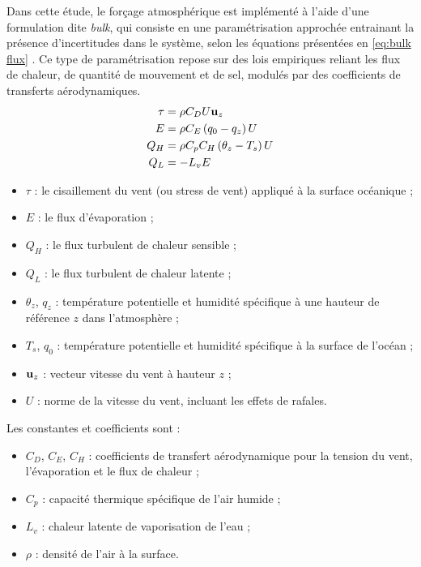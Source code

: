 Dans cette étude, le forçage atmosphérique est implémenté à l’aide d’une formulation dite \textit{bulk}, qui consiste en une paramétrisation approchée entrainant la présence d'incertitudes dans le système, selon les équations présentées en \autoref{eq:bulk flux} \cite{bonino_bulk_2022}. Ce type de paramétrisation repose sur des lois empiriques reliant les flux de chaleur, de quantité de mouvement et de sel, modulés par des coefficients de transferts aérodynamiques.
\begin{subequations}
\label{eq:bulk flux}
\begin{align}
	\tau & = \rho C_D U \mathbf{u}_z \label{eq:bulk cd} \\
	E & = \rho C_E \left( q_0 - q_z \right) U \\
	Q_H & = \rho C_p C_H \left( \theta_z - T_s \right) U \\
	Q_L & = - L_v E
\end{align}
\end{subequations}

\begin{itemize}
	\item $\tau$ : le cisaillement du vent (ou stress de vent) appliqué à la surface océanique ;
	\item $E$ : le flux d'évaporation ;
	\item $Q_H$ : le flux turbulent de chaleur sensible ;
	\item $Q_L$ : le flux turbulent de chaleur latente ;
	\item $\theta_z$, $q_z$ : température potentielle et humidité spécifique à une hauteur de référence $z$ dans l’atmosphère ;
	\item $T_s$, $q_0$ : température potentielle et humidité spécifique à la surface de l’océan ;
	\item $\mathbf{u}_z$ : vecteur vitesse du vent à hauteur $z$ ;
	\item $U$ : norme de la vitesse du vent, incluant les effets de rafales.
\end{itemize}

Les constantes et coefficients sont :
\begin{itemize}
	\item $C_D$, $C_E$, $C_H$ : coefficients de transfert aérodynamique pour la tension du vent, l’évaporation et le flux de chaleur ;
	\item $C_p$ : capacité thermique spécifique de l’air humide ;
	\item $L_v$ : chaleur latente de vaporisation de l’eau ;
	\item $\rho$ : densité de l’air à la surface.
\end{itemize}

